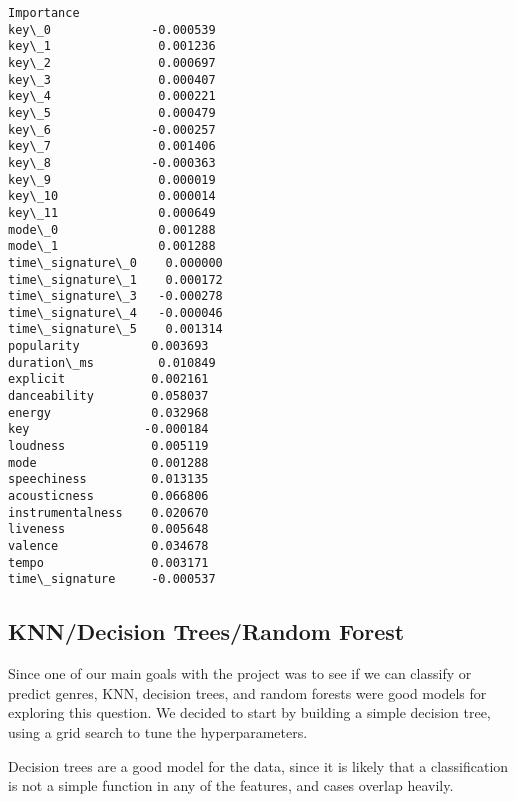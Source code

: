 \documentclass[11pt]{article}
\makeatletter
\newcommand{\boxspacing}{\kern\kvtcb@left@rule\kern\kvtcb@boxsep}
\newcommand{\prompt}[4]{
        {\ttfamily\llap{{\color{#2}[#3]:\hspace{3pt}#4}}\vspace{-\baselineskip}}
    }
\makeatother
\begin{document}
            \begin{tcolorbox}[breakable, size=fbox, boxrule=.5pt, pad at break*=1mm, opacityfill=0]
\prompt{Out}{outcolor}{107}{\boxspacing}
\begin{Verbatim}[commandchars=\\\{\}]
                  Importance
key\_0              -0.000539
key\_1               0.001236
key\_2               0.000697
key\_3               0.000407
key\_4               0.000221
key\_5               0.000479
key\_6              -0.000257
key\_7               0.001406
key\_8              -0.000363
key\_9               0.000019
key\_10              0.000014
key\_11              0.000649
mode\_0              0.001288
mode\_1              0.001288
time\_signature\_0    0.000000
time\_signature\_1    0.000172
time\_signature\_3   -0.000278
time\_signature\_4   -0.000046
time\_signature\_5    0.001314
popularity          0.003693
duration\_ms         0.010849
explicit            0.002161
danceability        0.058037
energy              0.032968
key                -0.000184
loudness            0.005119
mode                0.001288
speechiness         0.013135
acousticness        0.066806
instrumentalness    0.020670
liveness            0.005648
valence             0.034678
tempo               0.003171
time\_signature     -0.000537
\end{Verbatim}
\end{tcolorbox}
        
    \subsection{KNN/Decision Trees/Random
Forest}\label{knndecision-treesrandom-forest}

Since one of our main goals with the project was to see if we can
classify or predict genres, KNN, decision trees, and random forests were
good models for exploring this question. We decided to start by building
a simple decision tree, using a grid search to tune the hyperparameters.

Decision trees are a good model for the data, since it is likely that a
classification is not a simple function in any of the features, and
cases overlap heavily.
\end{document}
